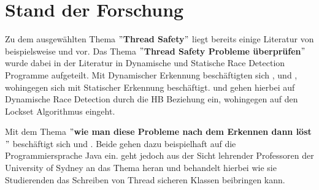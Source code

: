 \chapter{Stand der Forschung}

Zu dem ausgewählten Thema $"$\textbf{Thread Safety}$"$ liegt bereits einige Literatur von beispielsweise \textcite{li_efficient_2019} und \textcite{erickson_effective_nodate} vor. Das Thema $"$\textbf{Thread Safety Probleme überprüfen}$"$ wurde dabei in der Literatur in Dynamische und Statische Race Detection Programme aufgeteilt. Mit Dynamischer Erkennung beschäftigten sich \textcite{li_efficient_2019}, \textcite{erickson_effective_nodate} und \textcite{savage_eraser_nodate}, wohingegen sich  \textcite{relay} mit Statischer Erkennung beschäftigt. \textcite{li_efficient_2019} und \textcite{erickson_effective_nodate} gehen hierbei auf Dynamische Race Detection durch die \ac{HB} Beziehung ein, wohingegen \textcite{savage_eraser_nodate} auf den Lockset Algorithmus eingeht.

Mit dem Thema $"$\textbf{wie man diese Probleme nach dem Erkennen dann löst}$"$ beschäftigt sich \textcite{brian} und \textcite{fekete_teaching_nodate}. Beide gehen dazu beispielhaft auf die Programmiersprache Java ein. \textcite{fekete_teaching_nodate} geht jedoch aus der Sicht lehrender Professoren der University of Sydney an das Thema heran und behandelt hierbei wie sie Studierenden das Schreiben von Thread sicheren Klassen beibringen kann.